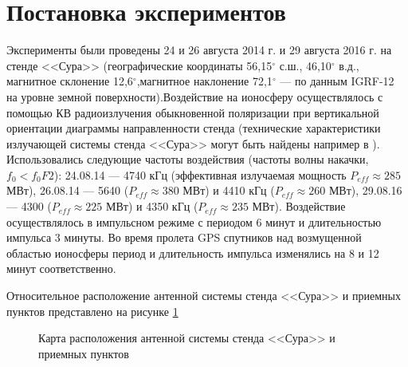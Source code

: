 \documentclass[12pt,a4paper]{article}
\begin{document}
\section{Постановка экспериментов} \label{sec:exp_setup}
Эксперименты были проведены 24 и 26 августа 2014 г. и 29 августа 2016 г. на стенде <<Сура>> (географические координаты 56,15$^{\circ}$ с.ш., 46,10$^{\circ}$ в.д., магнитное склонение 12,6$^{\circ}$,магнитное наклонение 72,1$^{\circ}$ --- по данным IGRF-12 \cite{Thebault2015} на уровне земной поверхности).Воздействие на ионосферу осуществлялось с помощью КВ радиоизлучения обыкновенной поляризации при вертикальной ориентации диаграммы направленности стенда (технические характеристики излучающей системы стенда <<Сура>> могут быть найдены например в \cite{BERNHARDTSCALESGRACHEtAl1991}). Использовались следующие частоты воздействия (частоты волны накачки, $f_0<f_{0}F2$): 24.08.14 --- 4740 кГц (эффективная излучаемая мощность $P_{eff} \approx 285$ МВт), 26.08.14 --- 5640 ($P_{eff} \approx 380$ МВт) и 4410 кГц ($P_{eff} \approx 260$ МВт), 29.08.16 --- 4300 ($P_{eff} \approx 225$ МВт) и 4350 кГц ($P_{eff} \approx 235$ МВт). Воздействие осуществлялось в импульсном режиме с периодом 6 минут и длительностью импульса 3 минуты. Во время пролета GPS спутников над возмущенной областью ионосферы период и длительность импульса изменялись на 8 и 12 минут соответственно.

Относительное расположение антенной системы стенда <<Сура>> и приемных пунктов представлено на рисунке \ref{fig:fig1}

\begin{figure}[h]
	\caption{Карта расположения антенной системы стенда <<Сура>> и приемных пунктов}
	\label{fig:fig1}
\end{figure}
\end{document}
